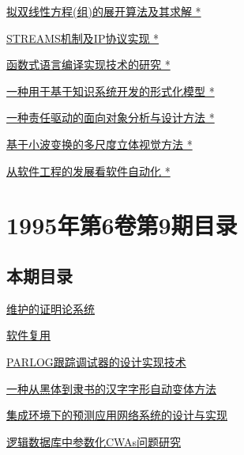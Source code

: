 \documentclass[a4paper]{article}
\begin{document}
\href{http://www.jos.org.cn/ch/reader/download_pdf.aspx?file_no=1995s135&year_id=1995&quarter_id=zk&falg=1}{拟双线性方程(组)的展开算法及其求解 *}

\href{http://www.jos.org.cn/ch/reader/download_pdf.aspx?file_no=1995s136&year_id=1995&quarter_id=zk&falg=1}{STREAMS机制及IP协议实现 *}

\href{http://www.jos.org.cn/ch/reader/download_pdf.aspx?file_no=1995s137&year_id=1995&quarter_id=zk&falg=1}{函数式语言编译实现技术的研究 *}

\href{http://www.jos.org.cn/ch/reader/download_pdf.aspx?file_no=1995s138&year_id=1995&quarter_id=zk&falg=1}{一种用于基于知识系统开发的形式化模型 *}

\href{http://www.jos.org.cn/ch/reader/download_pdf.aspx?file_no=1995s139&year_id=1995&quarter_id=zk&falg=1}{一种责任驱动的面向对象分析与设计方法 *}

\href{http://www.jos.org.cn/ch/reader/download_pdf.aspx?file_no=1995s140&year_id=1995&quarter_id=zk&falg=1}{基于小波变换的多尺度立体视觉方法 *}

\href{http://www.jos.org.cn/ch/reader/download_pdf.aspx?file_no=1995s141&year_id=1995&quarter_id=zk&falg=1}{从软件工程的发展看软件自动化 *}


\section{\textbf{1995年第6卷第9期目录}}
\subsection{本期目录}
\href{http://www.jos.org.cn/ch/reader/download_pdf.aspx?file_no=19950901&year_id=1995&quarter_id=9&falg=1}{维护的证明论系统}

\href{http://www.jos.org.cn/ch/reader/download_pdf.aspx?file_no=19950902&year_id=1995&quarter_id=9&falg=1}{软件复用}

\href{http://www.jos.org.cn/ch/reader/download_pdf.aspx?file_no=19950903&year_id=1995&quarter_id=9&falg=1}{PARLOG跟踪调试器的设计实现技术}

\href{http://www.jos.org.cn/ch/reader/download_pdf.aspx?file_no=19950904&year_id=1995&quarter_id=9&falg=1}{一种从黑体到隶书的汉字字形自动变体方法}

\href{http://www.jos.org.cn/ch/reader/download_pdf.aspx?file_no=19950905&year_id=1995&quarter_id=9&falg=1}{集成环境下的预测应用网络系统的设计与实现}

\href{http://www.jos.org.cn/ch/reader/download_pdf.aspx?file_no=19950906&year_id=1995&quarter_id=9&falg=1}{逻辑数据库中参数化CWAs问题研究}
\end{document}
